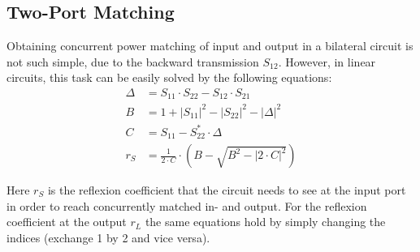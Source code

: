 \subsection{Two-Port Matching}

Obtaining concurrent power matching of input and output in a bilateral
circuit is not such simple, due to the backward transmission $S_{12}$.
However, in linear circuits, this task can be easily solved by the
following equations:
\begin{align}
\Delta & = S_{11}\cdot S_{22} - S_{12}\cdot S_{21} \\
B      & = 1 + |S_{11}|^2 - |S_{22}|^2 - |\Delta|^2 \\
C      & = S_{11} - S_{22}^* \cdot \Delta \\
r_S    & = \frac{1}{2\cdot C} \cdot \left( B - \sqrt{B^2 - |2\cdot C|^2 } \right)
\end{align}

Here $r_S$ is the reflexion coefficient that the circuit needs to see
at the input port in order to reach concurrently matched in- and
output.  For the reflexion coefficient at the output $r_L$ the same
equations hold by simply changing the indices (exchange 1 by 2 and
vice versa).
